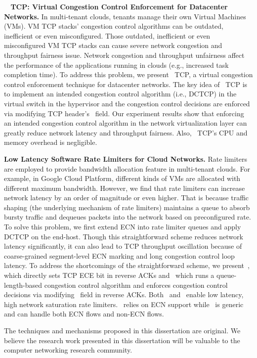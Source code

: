 {\bf ~\acdc{} TCP: Virtual Congestion Control Enforcement for Datacenter Networks.}
 In multi-tenant clouds, tenants manage their own Virtual Machines (VMs). VM TCP stacks' congestion 
control algorithms can be outdated, inefficient or even misconfigured. Those outdated, inefficient 
or even misconfigured VM TCP stacks can cause severe network congestion and throughput fairness issue. 
Network congestion and throughput unfairness affect the performance of the applications running in 
clouds (e.g., increased task completion time). To address this problem, we present~\acdc{} TCP, 
a virtual congestion control enforcement technique for datacenter networks. The key idea of~\acdc{} TCP 
is to implement an intended congestion control algorithm (i.e., DCTCP) in the virtual switch in the hypervisor 
and the congestion control decisions are enforced via modifying TCP header's~\rwnd{} field. 
Our experiment results show that enforcing an intended congestion control algorithm in 
the network virtualization layer can greatly reduce network latency and throughput fairness. 
Also,~\acdc{} TCP's CPU and memory overhead is negligible.  

{\bf Low Latency Software Rate Limiters for Cloud Networks.}
 Rate limiters are employed to provide bandwidth allocation feature in multi-tenant clouds. 
For example, in Google Cloud Platform, different kinds of VMs are allocated with 
different maximum bandwidth. However, we find that rate limiters can increase network latency 
by an order of magnitude or even higher. That is because traffic shaping 
(the underlying mechanism of rate limiters) maintains a queue to absorb bursty traffic 
and dequeues packets into the network based on preconfigured rate. To solve this 
problem, we first extend ECN into rate limiter queues and apply DCTCP on the end-host. 
Though this straightforward scheme reduces network latency significantly, it can also 
lead to TCP throughput oscillation because of coarse-grained segment-level ECN marking 
and long congestion control loop latency. To address the shortcomings of the straightforward scheme, 
we present~\dem{}, which directly sets TCP ECE bit in reverse ACKs and~\spring{} which runs 
a queue-length-based congestion control algorithm and enforces congestion control decisions 
via modifying~\rwnd{} field in reverse ACKs. Both~\dem{} and~\spring{} enable low latency, 
high network saturation rate limiters.~\dem{} relies on ECN support while~\spring{} is 
generic and can handle both ECN flows and non-ECN flows.

The techniques and mechanisms proposed in this dissertation are original. 
We believe the research work presented in this dissertation will be valuable to 
the computer networking research community.

